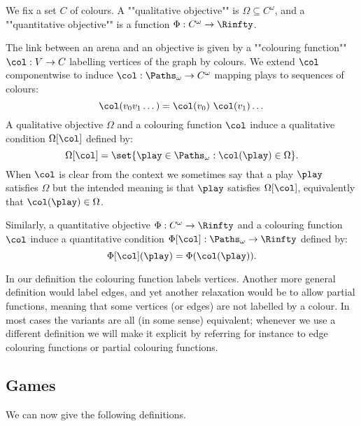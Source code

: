We fix a set $C$ of colours. 
A ""qualitative objective"" is $\Omega \subseteq C^\omega$, and a ""quantitative objective"" is a function $\Phi : C^\omega \to \Rinfty$. 

The link between an arena and an objective is given by a ""colouring function"" $\col : V \to C$ labelling vertices of the graph by colours.
We extend $\col$ componentwise to induce $\col : \Paths_\omega \to C^\omega$ mapping plays to sequences of colours:
\[
\col(v_0 v_1 \dots) = \col(v_0)\ \col(v_1) \dots
\]
A qualitative objective $\Omega$ and a colouring function $\col$ induce a qualitative condition $\Omega[\col]$ defined by:
\[
\Omega[\col] = \set{\play \in \Paths_\omega : \col(\play) \in \Omega}.
\] 
When $\col$ is clear from the context we sometimes say that a play $\play$ satisfies $\Omega$ but the intended meaning is that 
$\play$ satisfies $\Omega[\col]$, equivalently that $\col(\play) \in \Omega$.

Similarly, a quantitative objective $\Phi : C^\omega \to \Rinfty$ and a colouring function $\col$ induce 
a quantitative condition $\Phi[\col] : \Paths_\omega \to \Rinfty$ defined by:
\[
\Phi[\col](\play) = \Phi(\col(\play)).
\]

\begin{remark}
In our definition the colouring function labels vertices.
Another more general definition would label edges, and yet another relaxation would be to allow partial functions,
meaning that some vertices (or edges) are not labelled by a colour.
In most cases the variants are all (in some sense) equivalent; 
whenever we use a different definition we will make it explicit by referring for instance to edge colouring functions
or partial colouring functions.
\end{remark}


\subsection*{Games}
We can now give the following definitions.


